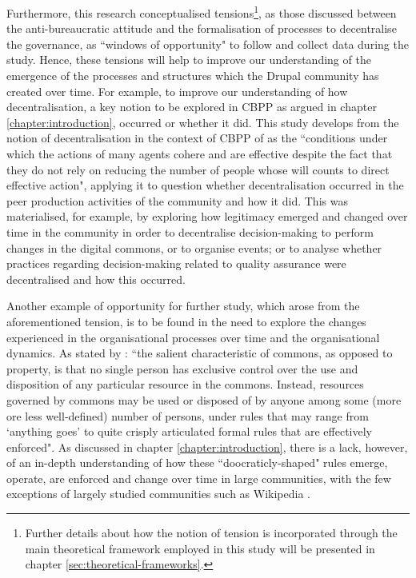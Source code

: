 Furthermore, this research conceptualised tensions\footnote{Further details about how the notion of tension is incorporated through the main theoretical framework employed in this study will be presented in chapter \ref{sec:theoretical-frameworks}.}, as those discussed between the anti-bureaucratic attitude and the formalisation of processes to decentralise the governance, as ``windows of opportunity" to follow and collect data during the study. Hence, these tensions will help to 
improve our understanding of the emergence of the processes and structures which the Drupal community has created over time. For example, to improve our understanding of how decentralisation, a key notion to be explored in CBPP as argued in chapter \ref{chapter:introduction}, occurred or whether it did. This study develops from the notion of decentralisation in the context of CBPP of \textcite[62]{benkler2006wealth} as the ``conditions under which the actions of many agents cohere and are effective despite the fact that they do not rely on reducing the number of people whose will counts to direct effective action", applying it to question whether decentralisation occurred in the peer production activities of the community and how it did. This was materialised, for example, by exploring how legitimacy emerged and changed over time in the community in order to decentralise decision-making to perform changes in the digital commons, or to organise events; or to analyse whether practices regarding decision-making related to quality assurance were decentralised and how this occurred.

Another example of opportunity for further study, which arose from the aforementioned tension, is to be found in the need to explore the changes experienced in the organisational processes over time and the organisational dynamics. As stated by \textcite[61]{benkler2006wealth}: ``the salient characteristic of commons, as opposed to property, is that no single person has exclusive control over the use and disposition of any particular resource in the commons. Instead, resources governed by commons may be used or disposed of by anyone among some (more ore less well-defined) number of persons, under rules that may range from `anything goes' to quite crisply articulated formal rules that are effectively enforced". As discussed in chapter \ref{chapter:introduction}, there is a lack, however, of an in-depth understanding of how these ``doocraticly-shaped" rules emerge, operate, are enforced and change over time in large communities, with the few exceptions of largely studied communities such as Wikipedia \parencite{viegas2007hidden, forte2009decentralization}.

